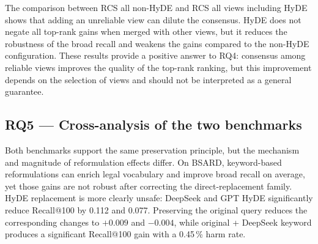 \documentclass[a4paper,fleqn]{cas-dc}
\begin{document}
\begin{table}[h]
\centering
\caption{RCS results on BSARD and LegalBench-RAG mini.
$\dagger$: significant gain after Holm correction.}
\label{tab:rcs}
\end{table}

The comparison between RCS all non-HyDE and RCS all views
including HyDE shows that adding an unreliable view
can dilute the consensus. HyDE does not negate all
top-rank gains when merged with other
views, but it reduces the robustness of the broad recall and
weakens the gains compared to the
non-HyDE configuration. These results provide a positive answer to RQ4:
consensus among reliable views improves the quality of
the top-rank ranking, but this improvement
depends on the selection of views and should not be
interpreted as a general guarantee.

\subsection{RQ5 --- Cross-analysis of the two benchmarks}
\label{sec:results-rq5}

Both benchmarks support the same preservation principle, but
the mechanism and magnitude of reformulation effects differ. On
BSARD, keyword-based reformulations can enrich legal vocabulary
and improve broad recall on average, yet those gains are not
robust after correcting the direct-replacement family. HyDE
replacement is more clearly unsafe: DeepSeek and GPT HyDE
significantly reduce Recall@100 by 0.112 and 0.077. Preserving
the original query reduces the corresponding changes to
$+0.009$ and $-0.004$, while original + DeepSeek keyword
produces a significant Recall@100 gain with a 0.45\,\% harm rate.
\end{document}
